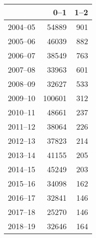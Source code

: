 \begin{table}[ht]
\centering
\begin{tabular}{rrr}
  \hline
 & 0--1 & 1--2 \\ 
  \hline
2004--05 & 54889 & 901 \\ 
  2005--06 & 46039 & 882 \\ 
  2006--07 & 38549 & 763 \\ 
  2007--08 & 33963 & 601 \\ 
  2008--09 & 32627 & 533 \\ 
  2009--10 & 100601 & 312 \\ 
  2010--11 & 48661 & 237 \\ 
  2011--12 & 38064 & 226 \\ 
  2012--13 & 37823 & 214 \\ 
  2013--14 & 41155 & 205 \\ 
  2014--15 & 45249 & 203 \\ 
  2015--16 & 34098 & 162 \\ 
  2016--17 & 32841 & 146 \\ 
  2017--18 & 25270 & 146 \\ 
  2018--19 & 32646 & 164 \\ 
   \hline
\end{tabular}
\end{table}
